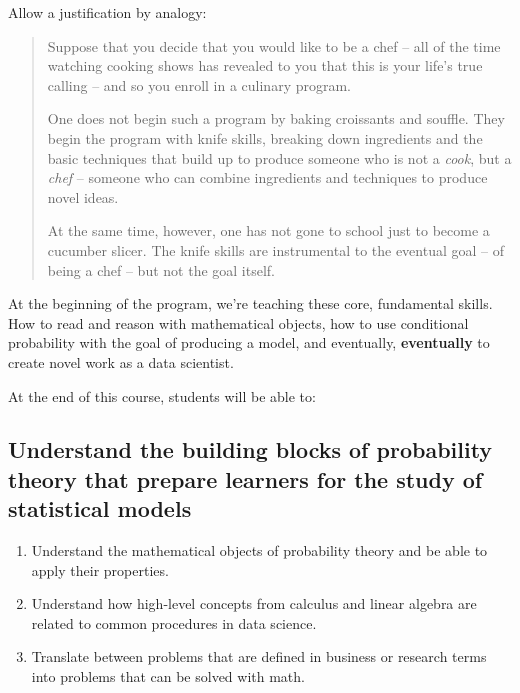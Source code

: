 \documentclass[
]{book}
\providecommand{\tightlist}{%
  \setlength{\itemsep}{0pt}\setlength{\parskip}{0pt}}
\theoremstyle{definition}
\theoremstyle{definition}
\theoremstyle{definition}
\theoremstyle{definition}
\theoremstyle{remark}
\begin{document}
Allow a justification by analogy:

\begin{quote}
Suppose that you decide that you would like to be a chef -- all of the time watching cooking shows has revealed to you that this is your life's true calling -- and so you enroll in a culinary program.

One does not begin such a program by baking croissants and souffle. They begin the program with knife skills, breaking down ingredients and the basic techniques that build up to produce someone who is not a \emph{cook}, but a \emph{chef} -- someone who can combine ingredients and techniques to produce novel ideas.

At the same time, however, one has not gone to school just to become a cucumber slicer. The knife skills are instrumental to the eventual goal -- of being a chef -- but not the goal itself.
\end{quote}

At the beginning of the program, we're teaching these core, fundamental skills. How to read and reason with mathematical objects, how to use conditional probability with the goal of producing a model, and eventually, \textbf{eventually} to create novel work as a data scientist.

At the end of this course, students will be able to:

\hypertarget{understand-the-building-blocks-of-probability-theory-that-prepare-learners-for-the-study-of-statistical-models}{%
\subsection{Understand the building blocks of probability theory that prepare learners for the study of statistical models}\label{understand-the-building-blocks-of-probability-theory-that-prepare-learners-for-the-study-of-statistical-models}}

\begin{enumerate}
\def\labelenumi{\arabic{enumi}.}
\tightlist
\item
  Understand the mathematical objects of probability theory and be able to apply their properties.
\item
  Understand how high-level concepts from calculus and linear algebra are related to common procedures in data science.
\item
  Translate between problems that are defined in business or research terms into problems that can be solved with math.
\end{enumerate}
\end{document}
